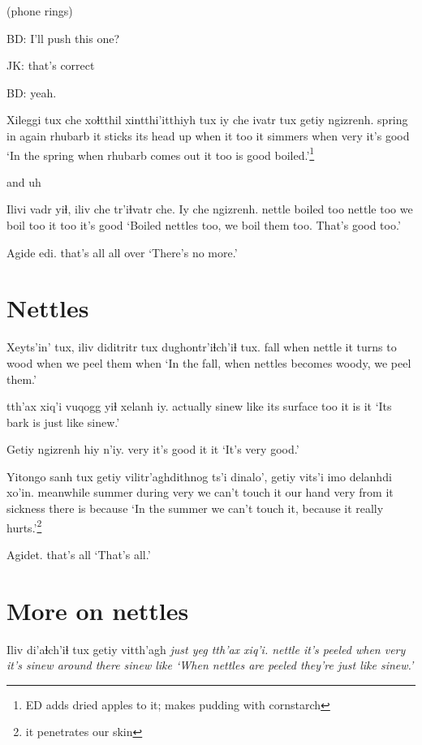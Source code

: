 \documentclass[12pt]{article}
\begin{document}
(phone rings)


BD:  I'll push this one?

JK:  that's correct

BD:   yeah. 

\gll Xileggi tux che xoɬtthil xintthi'itthiyh tux iy che ivatr tux getiy ngizrenh.
spring in       again rhubarb  {it sticks its head up} when it too {it simmers} when very {it's good}
\glt `In the spring when rhubarb comes out it too is good boiled.'\footnote{ED adds dried apples to it; makes pudding with cornstarch}
\glend

and uh

\gll Ilivi vadr yiɬ, iliv che tr'iɬvatr che. Iy che ngizrenh.
nettle boiled too nettle too {we boil} too it too {it's good}
\glt `Boiled nettles too, we boil them too. That's good too.'
\glend

\gll Agide edi.
{that's all} {all over}
\glt `There's no more.'
\glend

\section{Nettles}

\gll Xeyts'in' tux, iliv   diditritr tux           dughontr'iɬch'iɬ tux.
fall      when nettle {it turns to wood} when {we peel them} when
\glt `In the fall, when nettles becomes woody, we peel them.'
\glend

 tth'ax xiq'i vuqogg yiɬ xelanh iy.
actually sinew like {its surface} too {it is} it
\glt `Its bark is just like sinew.'
\glend

\gll Getiy ngizrenh hiy n'iy.
very {it's good} it it
\glt `It's very good.'
\glend

\gll Yitongo sanh tux getiy {vilitr'aghdithnog ts'i} dinalo', getiy vits'i imo delanhdi xo'in.
meanwhile summer during very {we can't touch it}   {our hand} very  {from it} sickness {there is} because
\glt `In the summer we can't touch it, because it really hurts.'\footnote{it penetrates our skin}
\glend

\gll Agidet.
{{that's all}}
\glt `That's all.'
\glend

\section{More on nettles}

\gll Iliv di'aɬch'iɬ tux getiy vitth'agh \em{just} yeg tth'ax xiq'i.
nettle {it's peeled}   when very {it's sinew} {} {around there}    sinew like
\glt `When nettles are peeled they're just like sinew.'
\glend
\end{document}
